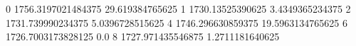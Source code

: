 0 1756.3197021484375 29.619384765625
1 1730.13525390625 3.4349365234375
2 1731.739990234375 5.0396728515625
4 1746.296630859375 19.5963134765625
6 1726.7003173828125 0.0
8 1727.971435546875 1.2711181640625
